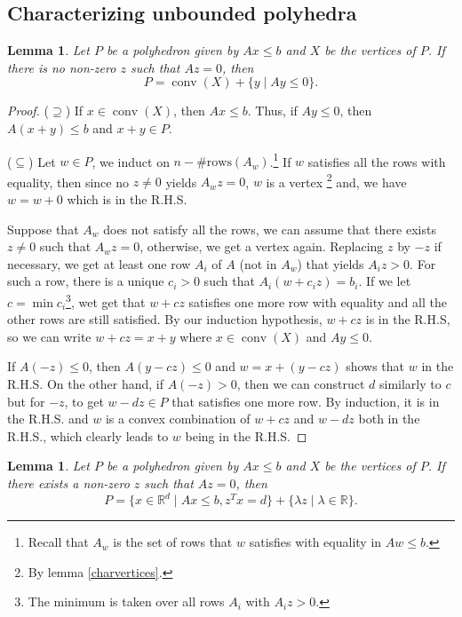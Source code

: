 \documentclass{tufte-handout}
\newtheorem{lem}[thm]{Lemma}
\theoremstyle{definition}
\theoremstyle{remark}
\newcommand{\R}{\mathbb{R}}
\DeclareMathOperator{\conv}{conv}
\begin{document}
\subsection{Characterizing unbounded polyhedra}
\begin{lem}\label{charubpolyA}
	Let $P$ be a polyhedron given by $Ax \leq b$ and $X$ be the vertices of $P$. If there is no non-zero $z$ such that $Az = 0$, then $$P = \conv(X) + \{y \mid Ay \leq 0\}.$$
\end{lem}
\begin{proof}
	($\supseteq$) If $x \in \conv(X)$, then $Ax\leq b$. Thus, if $Ay\leq 0$, then $A(x+y) \leq b$ and $x+y \in P$.
	
	($\subseteq$) Let $w \in P$, we induct on $n-\text{\#rows}(A_w)$.\footnote{Recall that $A_w$ is the set of rows that $w$ satisfies with equality in $Aw \leq b$.} If $w$ satisfies all the rows with equality, then since no $z \neq 0$ yields $A_wz = 0$, $w$ is a vertex \footnote{By lemma \ref{charvertices}.} and, we have $w = w+0$ which is in the R.H.S.
	
	Suppose that $A_w$ does not satisfy all the rows, we can assume that there exists $z\neq 0$ such that $A_wz = 0$, otherwise, we get a vertex again. Replacing $z$ by $-z$ if necessary, we get at least one row $A_i$ of $A$ (not in $A_w$) that yields $A_iz > 0$. For such a row, there is a unique $c_i>0$ such that $A_i(w+c_iz) = b_i$. If we let $c = \min{c_i}$\footnote{The minimum is taken over all rows $A_i$ with $A_iz > 0$.}, wet get that $w+cz$ satisfies one more row with equality and all the other rows are still satisfied. By our induction hypothesis, $w+cz$ is in the R.H.S, so we can write $w+cz = x+ y$ where $x \in \conv(X)$ and $Ay \leq 0$.
	
	If $A(-z) \leq 0$, then $A(y-cz) \leq 0$ and $w = x+(y-cz)$ shows that $w$ in the R.H.S. On the other hand, if $A(-z) > 0$, then we can construct $d$ similarly to $c$ but for $-z$, to get $w-dz \in P$ that satisfies one more row. By induction, it is in the R.H.S. and $w$ is a convex combination of $w+cz$ and $w-dz$ both in the R.H.S., which clearly leads to $w$ being in the R.H.S.
\end{proof}
\begin{lem}\label{charubpolyB}
	Let $P$ be a polyhedron given by $Ax\leq b$ and $X$ be the vertices of $P$. If there exists a non-zero $z$ such that $Az = 0$, then 
	$$P = \{x \in \R^d \mid Ax \leq b, z^Tx = d\} + \{\lambda z \mid \lambda \in \R\}.$$
\end{lem}
\end{document}
